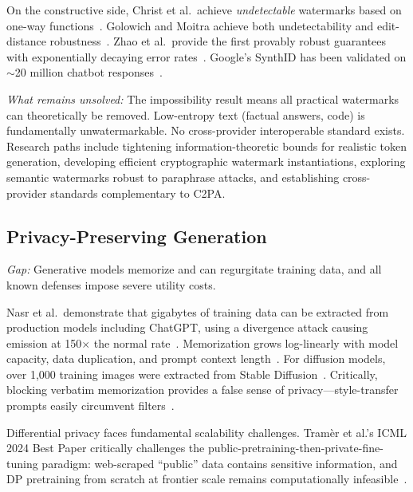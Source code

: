 On the constructive side, Christ et al.\ achieve \emph{undetectable} watermarks based on one-way functions~\cite{christ2024undetectable}. Golowich and Moitra achieve both undetectability and edit-distance robustness~\cite{golowich2024editdistance}. Zhao et al.\ provide the first provably robust guarantees with exponentially decaying error rates~\cite{zhao2024provable}. Google's SynthID has been validated on $\sim$20 million chatbot responses~\cite{dathathri2024synthid}.

\emph{What remains unsolved:} The impossibility result means all practical watermarks can theoretically be removed. Low-entropy text (factual answers, code) is fundamentally unwatermarkable. No cross-provider interoperable standard exists. Research paths include tightening information-theoretic bounds for realistic token generation, developing efficient cryptographic watermark instantiations, exploring semantic watermarks robust to paraphrase attacks, and establishing cross-provider standards complementary to C2PA.


\subsection{Privacy-Preserving Generation}
\label{sec:future-privacy}

\emph{Gap:} Generative models memorize and can regurgitate training data, and all known defenses impose severe utility costs.

Nasr et al.\ demonstrate that gigabytes of training data can be extracted from production models including ChatGPT, using a divergence attack causing emission at 150$\times$ the normal rate~\cite{nasr2025extraction}. Memorization grows log-linearly with model capacity, data duplication, and prompt context length~\cite{carlini2023quantifying}. For diffusion models, over 1,000 training images were extracted from Stable Diffusion~\cite{carlini2023extractingdiffusion}. Critically, blocking verbatim memorization provides a false sense of privacy---style-transfer prompts easily circumvent filters~\cite{ippolito2023verbatim}.

Differential privacy faces fundamental scalability challenges. Tram\`er et al.'s ICML 2024 Best Paper critically challenges the public-pretraining-then-private-fine-tuning paradigm: web-scraped ``public'' data contains sensitive information, and DP pretraining from scratch at frontier scale remains computationally infeasible~\cite{tramer2024dpposition}.

